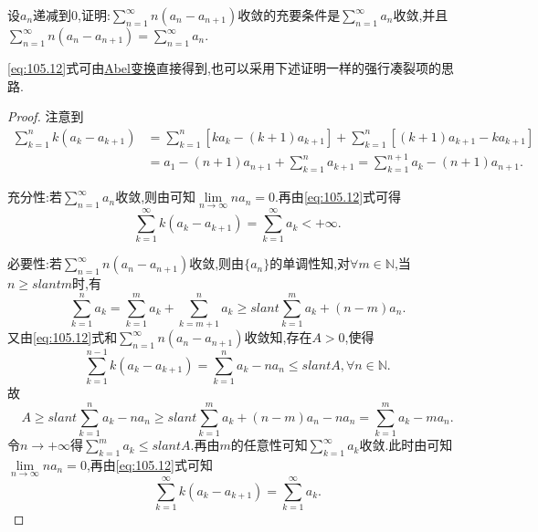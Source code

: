\documentclass[../../main.tex]{subfiles}
\begin{document}
\begin{proposition}\label{proposition:级数经典命题1}
设$a_n$递减到$0$,证明:$\sum\limits_{n=1}^\infty n\left(a_n-a_{n+1}\right)$收敛的充要条件是$\sum\limits_{n=1}^\infty a_n$收敛,并且$\sum\limits_{n=1}^\infty n\left(a_n-a_{n+1}\right)=\sum\limits_{n=1}^\infty a_n$.
\end{proposition}
\begin{note}
\eqref{eq:105.12}式可由\hyperref[theorem:Abel变换]{Abel变换}直接得到,也可以采用下述证明一样的强行凑裂项的思路.
\end{note}
\begin{proof}
注意到
\begin{align}
\sum_{k=1}^n{k\left( a_k-a_{k+1} \right)}&=\sum_{k=1}^n{\left[ ka_k-\left( k+1 \right) a_{k+1} \right]}+\sum_{k=1}^n{\left[ \left( k+1 \right) a_{k+1}-ka_{k+1} \right]} \nonumber \\
&=a_1-\left( n+1 \right) a_{n+1}+\sum_{k=1}^n{a_{k+1}}=\sum_{k=1}^{n+1}{a_k}-\left( n+1 \right) a_{n+1}. \label{eq:105.12}
\end{align}

{\heiti 充分性:}若$\sum_{n=1}^{\infty}{a_n}$收敛,则由可知$\lim\limits_{n\rightarrow \infty}na_n=0$.再由\eqref{eq:105.12}式可得
$$\sum_{k=1}^{\infty}{k\left( a_k-a_{k+1} \right)}=\sum_{k=1}^{\infty}{a_k}<+\infty .$$

{\heiti 必要性:}若$\sum_{n=1}^{\infty}{n\left( a_n-a_{n+1} \right)}$收敛,则由$\{ a_n \}$的单调性知,对$\forall m\in \mathbb{N}$,当$n\geqslant slant m$时,有
$$\sum_{k=1}^n{a_k}=\sum_{k=1}^m{a_k}+\sum_{k=m+1}^n{a_k}\geqslant slant \sum_{k=1}^m{a_k}+\left( n-m \right) a_n.$$
又由\eqref{eq:105.12}式和$\sum_{n=1}^{\infty}{n\left( a_n-a_{n+1} \right)}$收敛知,存在$A>0$,使得
$$\sum_{k=1}^{n-1}{k\left( a_k-a_{k+1} \right)}=\sum_{k=1}^n{a_k}-na_n\leqslant slant A,\forall n\in \mathbb{N} .$$
故
$$A\geqslant slant \sum_{k=1}^n{a_k}-na_n\geqslant slant \sum_{k=1}^m{a_k}+\left( n-m \right) a_n-na_n=\sum_{k=1}^m{a_k}-ma_n.$$
令$n\rightarrow +\infty$得$\sum_{k=1}^m{a_k}\leqslant slant A$.再由$m$的任意性可知$\sum_{k=1}^{\infty}{a_k}$收敛.此时由可知$\lim\limits_{n\rightarrow \infty}na_n=0$,再由\eqref{eq:105.12}式可知
$$\sum_{k=1}^{\infty}{k\left( a_k-a_{k+1} \right)}=\sum_{k=1}^{\infty}{a_k}.$$
\end{proof}
\end{document}
